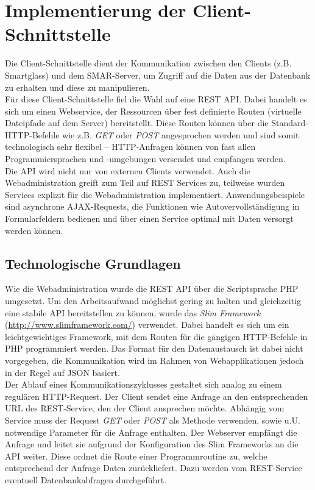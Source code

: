 \chapter{Implementierung der Client-Schnittstelle}
\label{cha:impl_api}

Die Client-Schnittstelle dient der Kommunikation zwischen den Clients (z.B. Smartglass) und dem \acs{SMAR}-Server, um Zugriff auf die Daten aus der Datenbank zu erhalten und diese zu manipulieren.\\

Für diese Client-Schnittstelle fiel die Wahl auf eine \acs{REST} \acs{API}. Dabei handelt es sich um einen Webservice, der Ressourcen über fest definierte Routen (virtuelle Dateipfade auf dem Server) bereitstellt. Diese Routen können über die Standard-\acs{HTTP}-Befehle wie z.B. \emph{GET} oder \emph{POST} angesprochen werden und sind somit technologisch sehr flexibel -- \acs{HTTP}-Anfragen können von fast allen Programmiersprachen und -umgebungen versendet und empfangen werden.\\

Die \acs{API} wird nicht nur von externen Clients verwendet. Auch die Webadministration greift zum Teil auf \acs{REST} Services zu, teilweise wurden Services explizit für die Webadministration implementiert. Anwendungsbeispiele sind asynchrone \acs{AJAX}-Requests, die Funktionen wie Autovervollständigung in Formularfeldern bedienen und über einen Service optimal mit Daten versorgt werden können.

\section{Technologische Grundlagen}
Wie die Webadministration wurde die \acs{REST} \acs{API} über die Scriptsprache \acs{PHP} umgesetzt. Um den Arbeitsaufwand möglichst gering zu halten und gleichzeitig eine stabile API bereitstellen zu können, wurde das \emph{Slim Framework} (\url{http://www.slimframework.com/}) verwendet. Dabei handelt es sich um ein leichtgewichtiges Framework, mit dem Routen für die gängigen \acs{HTTP}-Befehle in \acs{PHP} programmiert werden. Das Format für den Datenaustausch ist dabei nicht vorgegeben, die Kommunikation wird im Rahmen von Webapplikationen jedoch in der Regel auf \ac{JSON} basiert.\\

Der Ablauf eines Kommunikationszyklusses gestaltet sich analog zu einem regulären \acs{HTTP}-Request. Der Client sendet eine Anfrage an den entsprechenden \acs{URL} des \acs{REST}-Service, den der Client ansprechen möchte. Abhängig vom Service muss der Request \emph{GET} oder \emph{POST} als Methode verwenden, sowie u.U. notwendige Parameter für die Anfrage enthalten. Der Webserver empfängt die Anfrage und leitet sie aufgrund der Konfiguration des Slim Frameworks an die \acs{API} weiter. Diese ordnet die Route einer Programmroutine zu, welche entsprechend der Anfrage Daten zurückliefert. Dazu werden vom REST-Service eventuell Datenbankabfragen durchgeführt.

